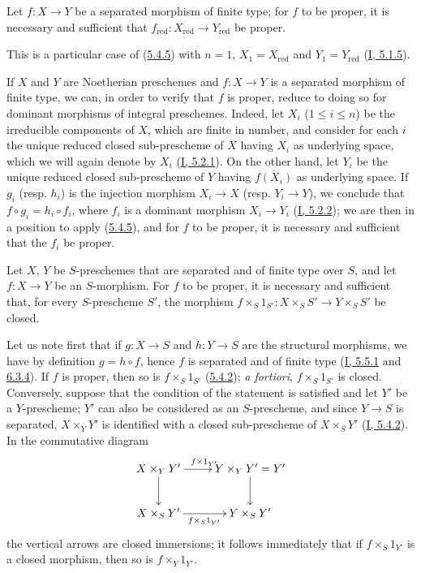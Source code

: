 \begin{corollary}[5.4.6]
\label{II.5.4.6}
Let $f:X\to Y$ be a separated morphism of finite type; for $f$ to be
proper, it is necessary and sufficient that
$f_{\mathrm{red}}:X_{\mathrm{red}}\to Y_{\mathrm{red}}$ be proper.
\end{corollary}

This is a particular case of (\hyperref[II.5.4.5]{5.4.5}) with $n=1$,
$X_1=X_{\mathrm{red}}$ and $Y_1=Y_{\mathrm{red}}$
(\hyperref[I.5.1.5]{I, 5.1.5}).

\begin{env}[5.4.7]
\label{II.5.4.7}
If $X$ and $Y$ are Noetherian preschemes and $f:X\to Y$ is a
separated morphism of finite type, we can, in order to verify that $f$ is
proper, reduce to doing so for dominant morphisms of integral preschemes.
Indeed, let $X_i$ ($1\leq i\leq n$) be the irreducible components of $X$,
which are finite in number, and consider for each $i$ the unique reduced
closed sub-prescheme of $X$ having $X_i$ as underlying space, which we will
again denote by $X_i$ (\hyperref[I.5.2.1]{I, 5.2.1}). On the other hand,
let $Y_i$ be the unique reduced closed sub-prescheme of $Y$ having
$\overline{f(X_i)}$ as underlying space. If $g_i$ (resp. $h_i$) is the
injection morphism $X_i\to X$ (resp. $Y_i\to Y$), we conclude that
$f\circ g_i=h_i\circ f_i$, where $f_i$ is a dominant morphism $X_i\to Y_i$
(\hyperref[I.5.2.2]{I, 5.2.2}); we are then in a position to apply
(\hyperref[II.5.4.5]{5.4.5}), and for $f$ to be proper, it is necessary
and sufficient that the $f_i$ be proper.
\end{env}

\begin{corollary}[5.4.8]
\label{II.5.4.8}
Let $X$, $Y$ be $S$-preschemes that are separated and of finite type over
$S$, and let $f:X\to Y$ be an $S$-morphism. For $f$ to be proper, it is
necessary and sufficient that, for every $S$-prescheme $S'$, the morphism
$f\times_S1_{S'}:X\times_SS'\to Y\times_SS'$ be closed.
\end{corollary}

Let us note first that if $g:X\to S$ and $h:Y\to S$ are the structural
morphisms, we have by definition $g=h\circ f$, hence $f$ is separated and of
finite type (\hyperref[I.5.5.1]{I, 5.5.1} and
\hyperref[I.6.3.4]{6.3.4}). If $f$ is proper, then so is
$f\times_S1_{S'}$ (\hyperref[II.5.4.2]{5.4.2}); \emph{a fortiori},
$f\times_S1_{S'}$ is closed. Conversely, suppose that the condition of the
statement is satisfied and let $Y'$ be a $Y$-prescheme; $Y'$ can also be
considered as an $S$-prescheme, and since $Y\to S$ is separated,
$X\times_YY'$ is identified with a closed sub-prescheme of $X\times_SY'$
(\hyperref[I.5.4.2]{I, 5.4.2}). In the commutative diagram
\[
  \xymatrix{
    X\times_YY'\ar[r]^{f\times1_{Y'}}\ar[d] &
    Y\times_YY'=Y'\ar[d]\\
    X\times_SY'\ar[r]_{f\times_S1_{Y'}} & Y\times_SY'
  }
\]
the vertical arrows are closed immersions; it follows immediately
that if $f\times_S1_{Y'}$ is a closed morphism, then so is
$f\times_Y1_{Y'}$.

